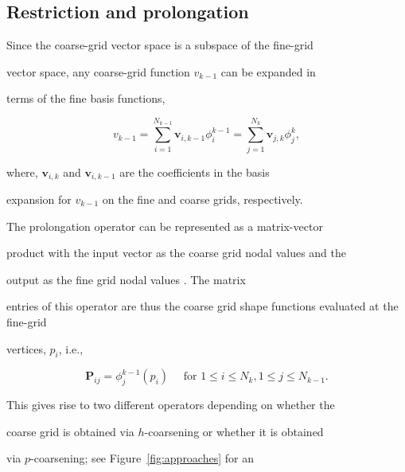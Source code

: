 \documentclass[smallcondensed,final]{svjour3}     %
\begin{document}



\subsection{Restriction and prolongation} %

\label{sub:restriction_&_prolongation}

Since the coarse-grid vector space is a subspace of the fine-grid

vector space, any coarse-grid function $v_{k-1}$ can be expanded in

terms of the fine basis functions,

\begin{equation} 

  v_{k-1} = \sum_{i=1}^{N_{k-1}} \mathbf v_{i,k-1}\phi_i^{k-1} = \sum_{j=1}^{N_k} \mathbf v_{j,k}\phi_j^k, 

\end{equation} 

where, $\mathbf v_{i,k}$ and $\mathbf v_{i,k-1}$ are the coefficients in the basis

expansion for $v_{k-1}$ on the fine and coarse grids, respectively.



The prolongation operator can be represented as a matrix-vector

product with the input vector as the coarse grid nodal values and the

output as the fine grid nodal values \cite{SampathBiros10}. The matrix

entries of this operator are thus the coarse grid shape functions evaluated at the fine-grid

vertices, $p_i$, i.e.,

\begin{equation}

	\label{eq:Pstencil}

	\mathbf P_{\!ij} = \phi_j^{k-1}(p_i) \quad \text{ for } 1\le i \le N_k, 1\le j\le N_{k-1}. 

\end{equation}

This gives rise to two different operators depending on whether the

coarse grid is obtained via $h$-coarsening or whether it is obtained

via $p$-coarsening; see Figure~\ref{fig:approaches} for an
\end{document}
